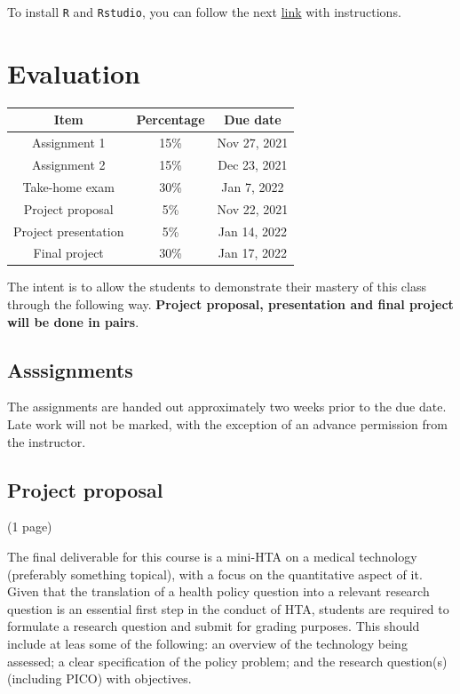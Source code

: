 \documentclass[
]{book}
\begin{document}
To install \texttt{R} and \texttt{Rstudio}, you can follow the next \href{https://rstudio-education.github.io/hopr/starting.html}{link} with instructions.

\hypertarget{evaluation}{%
\section*{Evaluation}\label{evaluation}}

\begin{longtable}[]{@{}ccc@{}}
\toprule
Item & Percentage & Due date \\
\midrule
\endhead
Assignment 1 & 15\% & Nov 27, 2021 \\
Assignment 2 & 15\% & Dec 23, 2021 \\
Take-home exam & 30\% & Jan 7, 2022 \\
Project proposal & 5\% & Nov 22, 2021 \\
Project presentation & 5\% & Jan 14, 2022 \\
Final project & 30\% & Jan 17, 2022 \\
\bottomrule
\end{longtable}

The intent is to allow the students to demonstrate their mastery of this class through the following way. \textbf{Project proposal, presentation and final project will be done in pairs}.

\hypertarget{asssignments}{%
\subsection*{Asssignments}\label{asssignments}}

The assignments are handed out approximately two weeks prior to the due date. Late work will not be marked, with the exception of an advance permission from the instructor.

\hypertarget{project-proposal}{%
\subsection*{Project proposal}\label{project-proposal}}

(1 page)

The final deliverable for this course is a mini-HTA on a medical technology (preferably something topical), with a focus on the quantitative aspect of it. Given that the translation of a health policy question into a relevant research question is an essential first step in the conduct of HTA, students are required to formulate a research question and submit for grading purposes. This should include at leas some of the following: an overview of the technology being assessed; a clear specification of the policy problem; and the research question(s) (including PICO) with objectives.
\end{document}
